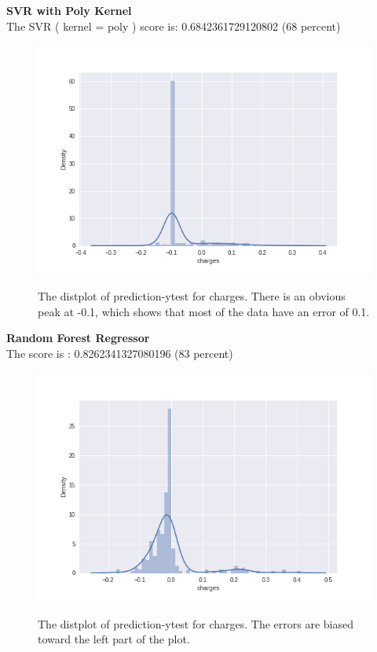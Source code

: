 \documentclass[12pt]{article}
\begin{document}
\textbf{SVR with Poly Kernel}\\
The SVR ( kernel = poly ) score is: 0.6842361729120802 (68 percent)
\begin{figure}[H]
\centering
\includegraphics[width=\textwidth]{svr_poly1.png}
\label{mesh:fig1}
\caption{The distplot of prediction-ytest for charges. There is an obvious peak at -0.1, which shows that most of the data have an error of 0.1.}
\end{figure}
\pagebreak
\textbf{Random Forest Regressor}\\
The score is : 0.8262341327080196 (83 percent)
\begin{figure}[H]
\centering
\includegraphics[width=\textwidth]{rand_forest_reg (1).png}
\label{mesh:fig1}
\caption{The distplot of prediction-ytest for charges. The errors are biased toward the left part of the plot.}
\end{figure}
\end{document}

